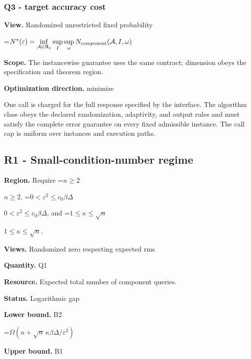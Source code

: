 \documentclass[10pt,a4paper]{article}
\newcommand{\AtlasMath}[1]{\par\begingroup\centering\setbox0=\hbox{$\displaystyle #1$}\ifdim\wd0>1.4\linewidth\typeout{ATLAS WIDE FORMULA: \the\wd0}\fi\ifdim\wd0>\linewidth\resizebox{\linewidth}{!}{\box0}\else\box0\fi\par\endgroup}
\newcommand{\AtlasInlineMath}[1]{\begingroup\setbox0=\hbox{$#1$}\ifdim\wd0>.4\linewidth\endgroup\AtlasMath{#1}\else\endgroup$#1$\fi}
\begin{document}
\subsubsection{Q3 - target accuracy cost}


\textbf{View.} Randomized unrestricted fixed probability



\AtlasMath{N^\star(\varepsilon)=\inf_{\mathcal A\in\mathfrak A_\varepsilon}\sup_I \sup_\omega N_{\rm component}(\mathcal A,I,\omega)}


\textbf{Scope.} The instancewise guarantee uses the same contract; dimension obeys the specification and theorem region.



\textbf{Optimization direction.} minimize



One call is charged for the full response specified by the interface. The algorithm class obeys the declared randomization, adaptivity, and output rules and must satisfy the complete error guarantee on every fixed admissible instance. The call cap is uniform over instances and execution paths.



\subsection{R1 - Small-condition-number regime}


\textbf{Region.} Require \AtlasInlineMath{n\ge2}, \AtlasInlineMath{0<\varepsilon^2\le c_0\beta\Delta}, and \AtlasInlineMath{1\le\kappa\le\sqrt n}.



\textbf{Views.} Randomized zero respecting expected rms



\textbf{Quantity.} Q1



\textbf{Resource.} Expected total number of component queries.



\textbf{Status.} Logarithmic gap



\textbf{Lower bound.} B2



\AtlasMath{\Omega(n+\sqrt n\,\kappa\beta\Delta/\varepsilon^2)}


\textbf{Upper bound.} B1
\end{document}
